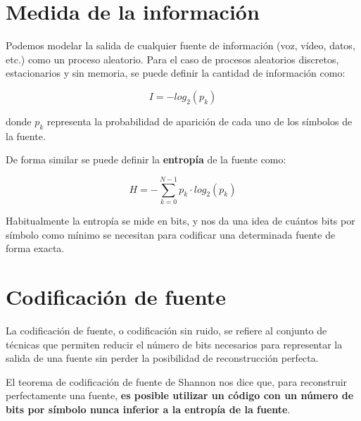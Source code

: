 \documentclass[es,apuntes]{uah}
\begin{document}
\profesor{}
\tel{}
\mail{} %
\date{} %

\maketitle


\section{Medida de la información}

Podemos modelar la salida de cualquier fuente de información (voz, vídeo, datos, etc.) como un proceso aleatorio. Para el caso de procesos aleatorios discretos, estacionarios y sin memoria, se puede definir la cantidad de información como:

\begin{displaymath}
	I = -log_2(p_k)
\end{displaymath}

donde $p_k$ representa la probabilidad de aparición de cada uno de los símbolos de la fuente. 

De forma similar se puede definir la {\bf entropía} de la fuente como:

\begin{equation}
	H = - \sum_{k=0}^{N-1}p_k \cdot  log_2(p_k)
\end{equation}

Habitualmente la entropía se mide en bits, y nos da una idea de cuántos bits por símbolo como mínimo se necesitan para codificar una determinada fuente de forma exacta.

\section{Codificación de fuente}

La codificación de fuente, o codificación sin ruido, se refiere al conjunto de técnicas que permiten reducir el número de bits necesarios para representar la salida de una fuente sin perder la posibilidad de reconstrucción perfecta. 

El teorema de codificación de fuente de Shannon nos dice que, para reconstruir perfectamente una fuente, {\bf es posible utilizar un código con un número de bits por símbolo nunca inferior a la entropía de la fuente}.
\end{document}
